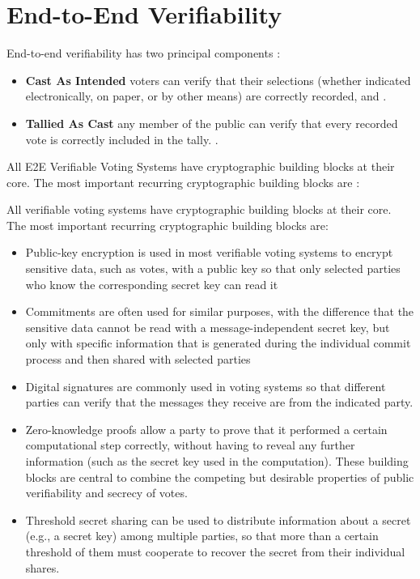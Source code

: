 \section{End-to-End Verifiability}

End-to-end verifiability has two principal components \cite[2]{e2e-primer}:
\begin{itemize}
    \item \textbf{Cast As Intended} voters can verify that their selections (whether indicated electronically, on
    paper, or by other means) are correctly recorded, and \cite[2]{e2e-primer}.
    \item \textbf{Tallied As Cast} any member of the public can verify that every recorded vote is correctly
    included in the tally. \cite[2]{e2e-primer}.
\end{itemize}

All E2E Verifiable Voting Systems have cryptographic building blocks at their core. The most important recurring cryptographic building blocks are \cite[13]{onlinee-2e-study}:

All verifiable voting systems have cryptographic building blocks at their core. The most important recurring cryptographic building blocks are:
\begin{itemize}
    \item Public-key encryption is used in most verifiable voting systems to encrypt sensitive data, such as votes, with a public key so that only selected parties who know the corresponding secret key can read it
    \item Commitments are often used for similar purposes, with the difference that the sensitive data cannot be read with a message-independent secret key, but only with specific information that is generated during the individual commit process and then shared with selected parties
    \item Digital signatures are commonly used in voting systems so that different parties 
    can verify that the messages they receive are from the indicated party.
    \item Zero-knowledge proofs allow a party to prove that it performed a certain computational step correctly, without having to reveal any further information (such as the secret key used in the computation). These building blocks are central to combine the competing but desirable properties of public verifiability and secrecy of votes.
    \item Threshold secret sharing can be used to distribute information about a secret (e.g., a secret key) among multiple parties, so that more than a certain threshold of them must cooperate to recover the secret from their individual shares.
\end{itemize}

